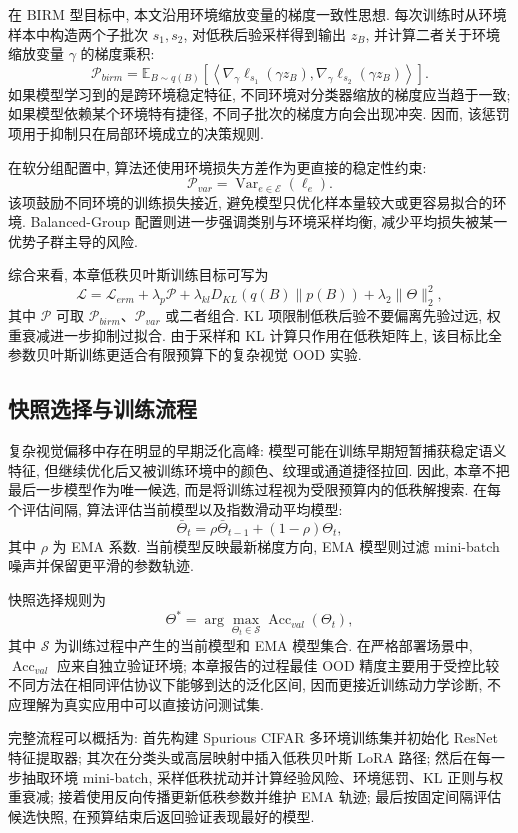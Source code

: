 \documentclass[a4paper,punct=banjiao,twoside]{ctexrep}
\theoremstyle{plain}
\theoremstyle{definition}
\theoremstyle{remark}
\begin{document}
在 BIRM 型目标中, 本文沿用环境缩放变量的梯度一致性思想. 每次训练时从环境样本中构造两个子批次 $s_1,s_2$, 对低秩后验采样得到输出 $z_B$, 并计算二者关于环境缩放变量 $\gamma$ 的梯度乘积:
\[
    \mathcal{P}_{birm}
    =
    \mathbb{E}_{B\sim q(B)}
    \left[
    \left\langle
    \nabla_{\gamma}\ell_{s_1}(\gamma z_B),
    \nabla_{\gamma}\ell_{s_2}(\gamma z_B)
    \right\rangle
    \right].
\]
如果模型学习到的是跨环境稳定特征, 不同环境对分类器缩放的梯度应当趋于一致; 如果模型依赖某个环境特有捷径, 不同子批次的梯度方向会出现冲突. 因而, 该惩罚项用于抑制只在局部环境成立的决策规则.

在软分组配置中, 算法还使用环境损失方差作为更直接的稳定性约束:
\[
    \mathcal{P}_{var}=\operatorname{Var}_{e\in\mathcal{E}}(\ell_e).
\]
该项鼓励不同环境的训练损失接近, 避免模型只优化样本量较大或更容易拟合的环境. Balanced-Group 配置则进一步强调类别与环境采样均衡, 减少平均损失被某一优势子群主导的风险.

综合来看, 本章低秩贝叶斯训练目标可写为
\[
    \mathcal{L}
    =
    \mathcal{L}_{erm}
    +\lambda_p\mathcal{P}
    +\lambda_{kl}D_{KL}(q(B)\|p(B))
    +\lambda_2\|\Theta\|_2^2 ,
\]
其中 $\mathcal{P}$ 可取 $\mathcal{P}_{birm}$、$\mathcal{P}_{var}$ 或二者组合. KL 项限制低秩后验不要偏离先验过远, 权重衰减进一步抑制过拟合. 由于采样和 KL 计算只作用在低秩矩阵上, 该目标比全参数贝叶斯训练更适合有限预算下的复杂视觉 OOD 实验.

\subsection{快照选择与训练流程}

复杂视觉偏移中存在明显的早期泛化高峰: 模型可能在训练早期短暂捕获稳定语义特征, 但继续优化后又被训练环境中的颜色、纹理或通道捷径拉回. 因此, 本章不把最后一步模型作为唯一候选, 而是将训练过程视为受限预算内的低秩解搜索. 在每个评估间隔, 算法评估当前模型以及指数滑动平均模型:
\[
    \bar{\Theta}_t=\rho\bar{\Theta}_{t-1}+(1-\rho)\Theta_t ,
\]
其中 $\rho$ 为 EMA 系数. 当前模型反映最新梯度方向, EMA 模型则过滤 mini-batch 噪声并保留更平滑的参数轨迹.

快照选择规则为
\[
    \Theta^{*}=\arg\max_{\Theta_t\in\mathcal{S}}\operatorname{Acc}_{val}(\Theta_t),
\]
其中 $\mathcal{S}$ 为训练过程中产生的当前模型和 EMA 模型集合. 在严格部署场景中, $\operatorname{Acc}_{val}$ 应来自独立验证环境; 本章报告的过程最佳 OOD 精度主要用于受控比较不同方法在相同评估协议下能够到达的泛化区间, 因而更接近训练动力学诊断, 不应理解为真实应用中可以直接访问测试集.

完整流程可以概括为: 首先构建 Spurious CIFAR 多环境训练集并初始化 ResNet 特征提取器; 其次在分类头或高层映射中插入低秩贝叶斯 LoRA 路径; 然后在每一步抽取环境 mini-batch, 采样低秩扰动并计算经验风险、环境惩罚、KL 正则与权重衰减; 接着使用反向传播更新低秩参数并维护 EMA 轨迹; 最后按固定间隔评估候选快照, 在预算结束后返回验证表现最好的模型.
\end{document}
